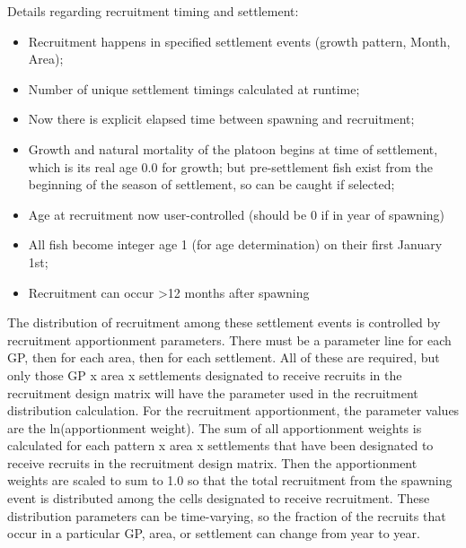 Details regarding recruitment timing and settlement:
	\begin{itemize}
		\item Recruitment happens in specified settlement events (growth pattern, Month, Area);
		\item Number of unique settlement timings calculated at runtime;
		\item Now there is explicit elapsed time between spawning and recruitment;
		\item Growth and natural mortality of the platoon begins at time of settlement, which is its real age 0.0 for growth; but pre-settlement fish exist from the beginning of the season of settlement, so can be caught if selected;
		\item Age at recruitment now user-controlled (should be 0 if in year of spawning)
		\item All fish become integer age 1 (for age determination) on their first January 1st;
		\item Recruitment can occur >12 months after spawning		
	\end{itemize}

The distribution of recruitment among these settlement events is controlled by recruitment apportionment parameters. There must be a parameter line for each GP, then for each area, then for each settlement.  All of these are required, but only those GP x area x settlements designated to receive recruits in the recruitment design matrix will have the parameter used in the recruitment distribution calculation.  For the recruitment apportionment, the parameter values are the ln(apportionment weight).  The sum of all apportionment weights is calculated for each pattern x area x settlements that have been designated to receive recruits in the recruitment design matrix.  Then the apportionment weights are scaled to sum to 1.0 so that the total recruitment from the spawning event is distributed among the cells designated to receive recruitment. These distribution parameters can be time-varying, so the fraction of the recruits that occur in a particular GP, area, or settlement can change from year to year. 

